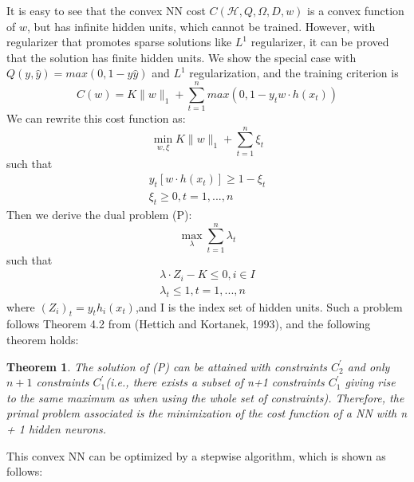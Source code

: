 \documentclass{article}
\begin{document}
It is easy to see that the convex NN cost $C(\mathcal{H}, Q, \Omega, D, w)$ is a convex function of $w$, but has infinite hidden units, which cannot be trained. However, with regularizer that promotes sparse solutions like $L^{1}$ regularizer, it can be proved that the solution has finite hidden units. We show the special case with $Q(y,\hat{y}) = max(0, 1-y\hat{y})$ and $L^{1}$ regularization, and the training criterion is 
\begin{equation}
C(w) = K\lVert w \rVert_{1} + \sum_{t=1}^{n}max(0, 1-y_{t}w\cdot h(x_{t}))
\end{equation}
We can rewrite this cost function as:
\begin{equation}
\min_{w, \xi} K \lVert w \rVert_{1} + \sum_{t=1}^{n} \xi_{t}
\end{equation}
such that
\begin{gather}
y_{t}[w\cdot h(x_{t})] \ge 1 - \xi_{t}\\
\xi_{t} \ge 0, t=1,...,n
\end{gather}
Then we derive the dual problem (P):
\begin{equation}
\max_{\lambda} \sum_{t=1}^{n} \lambda_{t}
\end{equation}
such that
\begin{gather}
\lambda \cdot Z_{i} - K \le 0, i \in I\\
\lambda_{t} \le 1, t=1,...,n
\end{gather}
where $(Z_{i})_{t}= y_{t}h_{i}(x_{t})$,and I is the index set of hidden units. Such a problem follows Theorem 4.2 from (Hettich and Kortanek, 1993), and the following theorem holds:
\newtheorem{tem}{Theorem}[section]
\begin{tem}
The solution of (P) can be attained with constraints $C_{2}^{'}$ and only $n + 1$ constraints $C_{1}^{'}$(i.e., there exists a subset of n+1 constraints $C_{1}^{'}$ giving rise to the same maximum
as when using the whole set of constraints). Therefore, the primal problem associated is the
minimization of the cost function of a NN with n + 1 hidden neurons.
\end{tem}
This convex NN can be optimized by a stepwise algorithm, which is shown as follows:
\renewcommand{\algorithmicrequire}{\textbf{Input:}}
\end{document}

